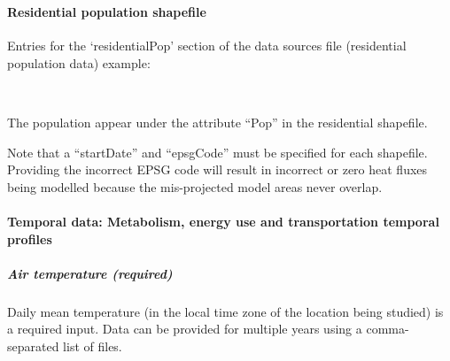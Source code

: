 \documentclass[letterpaper,10pt,english]{sphinxmanual}
\begin{document}
%
\begin{sphinxVerbatim}[commandchars=\\\{\}]
     
\end{sphinxVerbatim}


\paragraph{Residential population shapefile}
\label{\detokenize{OtherManuals/LQF_Manual:residential-population-shapefile}}
Entries for the ‘residentialPop’ section of the data sources file
(residential population data) example:

%
\begin{sphinxVerbatim}[commandchars=\\\{\}]
     
     
     
\end{sphinxVerbatim}

 The population  appear under the attribute “Pop” in
the residential shapefile.

Note that a “startDate” and “epsgCode” must be specified for each
shapefile. Providing the incorrect EPSG code will result in incorrect or
zero heat fluxes being modelled because the mis-projected model areas
never overlap.


\paragraph{Temporal data: Metabolism, energy use and transportation temporal profiles}
\label{\detokenize{OtherManuals/LQF_Manual:temporal-data-metabolism-energy-use-and-transportation-temporal-profiles}}

\subparagraph{Air temperature (required)}
\label{\detokenize{OtherManuals/LQF_Manual:air-temperature-required}}
Daily mean temperature (in the local time zone of the location being
studied) is a required input. Data can be provided for multiple years
using a comma-separated list of files.
\end{document}
